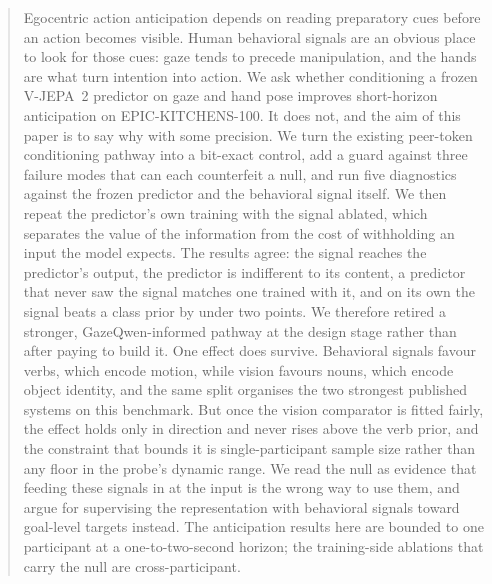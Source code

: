 \begin{abstract}
Egocentric action anticipation depends on reading preparatory cues before an
action becomes visible. Human behavioral signals are an obvious place to look for
those cues: gaze tends to precede manipulation, and the hands are what turn
intention into action. We ask whether conditioning a frozen V-JEPA~2 predictor on
gaze and hand pose improves short-horizon anticipation on EPIC-KITCHENS-100. It
does not, and the aim of this paper is to say why with some precision. We turn the
existing peer-token conditioning pathway into a bit-exact control, add a guard
against three failure modes that can each counterfeit a null, and run five diagnostics against the frozen predictor and the behavioral signal
itself. We then repeat the predictor's own training with the signal ablated,
which separates the value of the information from the cost of withholding an
input the model expects. The results agree: the signal reaches the predictor's
output, the predictor is indifferent to its content, a predictor that never saw
the signal matches one trained with it, and on its own the signal beats a class
prior by under two points. We therefore retired a stronger, GazeQwen-informed pathway at the
design stage rather than after paying to build it. One effect does survive.
Behavioral signals favour verbs, which encode motion, while vision favours nouns,
which encode object identity, and the same split organises the two strongest
published systems on this benchmark. But once the vision comparator is fitted
fairly, the effect holds only in direction and never rises above the verb prior,
and the constraint that bounds it is single-participant sample size rather than
any floor in the probe's dynamic range. We read the null as evidence that
feeding these signals in at the input is the wrong way to use them, and argue for
supervising the representation with behavioral signals toward goal-level targets
instead. The anticipation results here are bounded to one participant at a
one-to-two-second horizon; the training-side ablations that carry the null are
cross-participant.
\end{abstract}